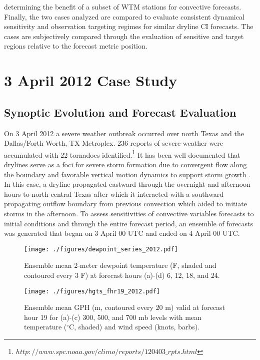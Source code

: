 \documentclass{ttuthes2007}
\newcommand{\tab}{\hspace*{2em}}  %
\begin{document}
determining the benefit of a subset of WTM stations for convective forecasts. Finally, the two cases analyzed are compared to evaluate consistent dynamical sensitivity and observation targeting regimes for similar dryline CI forecasts. The cases are subjectively compared through the evaluation of sensitive and target regions relative to the forecast metric position. 


\chapter{3 April 2012 Case Study}

\section{Synoptic Evolution and Forecast Evaluation}

\tab On 3 April 2012 a severe weather outbreak occurred over north Texas and the Dallas/Forth Worth, TX Metroplex. 236 reports of severe weather were accumulated with 22 tornadoes identified.\footnote{$http://www.spc.noaa.gov/climo/reports/120403\_rpts.html$} It has been well documented that drylines serve as a foci for severe storm formation due to convergent flow along the boundary and favorable vertical motion dynamics to support storm growth \citep{CarlsonandLudlam1968,KochandMcCarthy1982,Haneetal1993,Ziegleretal1997}. In this case, a dryline propagated eastward through the overnight and afternoon hours to north-central Texas after which it interacted with a southward propagating outflow boundary from previous convection which aided to initiate storms in the afternoon. To assess sensitivities of convective variables forecasts to initial conditions and through the entire forecast period, an ensemble of forecasts was generated that began on 3 April 00 UTC and ended on 4 April 00 UTC. 

\begin{figure}[!b]
  \centering
  \noindent\texttt{[image: ./figures/dewpoint\_series\_2012.pdf]}\\
  \caption{Ensemble mean 2-meter dewpoint temperature (F, shaded and contoured every 3 F) at forecast hours (a)-(d) 6, 12, 18, and 24.}
\label{dewpoint_series_2012}
\end{figure}

\begin{figure}[!tb]
  \centering
  \noindent\texttt{[image: ./figures/hgts\_fhr19\_2012.pdf]}\\
  \caption{Ensemble mean GPH (m, contoured every 20 m) valid at forecast hour 19 for (a)-(c) 300, 500, and 700 mb levels with mean temperature (${}^{\circ}$C, shaded) and wind speed (knots, barbs).}
  \label{hgts_fhr19_2012}
\end{figure}
\end{document}
